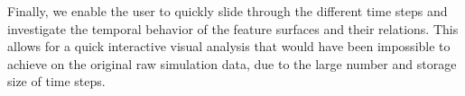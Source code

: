 Finally, we enable the user to quickly slide through the different time steps
and investigate the temporal behavior of the feature surfaces and their
relations. This allows for a quick interactive visual analysis that would have
been impossible to achieve on the original raw simulation data, due to the
large number and storage size of time steps.


%
